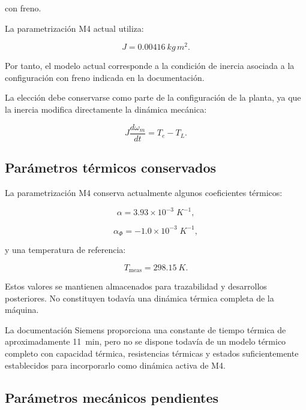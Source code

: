 con freno.

La parametrización M4 actual utiliza:

\begin{equation}
J=\SI{0.00416}{kg\,m^2}.
\end{equation}

Por tanto, el modelo actual corresponde a la condición de inercia asociada a la configuración con freno indicada en la documentación.

La elección debe conservarse como parte de la configuración de la planta, ya que la inercia modifica directamente la dinámica mecánica:

\begin{equation}
J\frac{d\omega_m}{dt}
=
T_e-T_L.
\end{equation}

\subsection{Parámetros térmicos conservados}

La parametrización M4 conserva actualmente algunos coeficientes térmicos:

\begin{equation}
\alpha=3.93\times10^{-3}\;K^{-1},
\end{equation}

\begin{equation}
\alpha_{\Phi}=-1.0\times10^{-3}\;K^{-1},
\end{equation}

y una temperatura de referencia:

\begin{equation}
T_{\mathrm{meas}}=\SI{298.15}{K}.
\end{equation}

Estos valores se mantienen almacenados para trazabilidad y desarrollos posteriores. No constituyen todavía una dinámica térmica completa de la máquina.

La documentación Siemens proporciona una constante de tiempo térmica de aproximadamente \SI{11}{min}, pero no se dispone todavía de un modelo térmico completo con capacidad térmica, resistencias térmicas y estados suficientemente establecidos para incorporarlo como dinámica activa de M4.

\subsection{Parámetros mecánicos pendientes}

